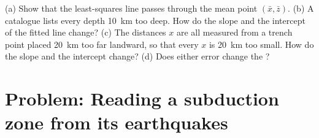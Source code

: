 \begin{exercise}[$\star\star\star$]\label{exo:b1:active-margins:12}
(a) Show that the least-squares line passes through the mean point
$(\bar x, \bar z)$. (b) A catalogue lists every depth \qty{10}{km} too deep.
How do the slope and the intercept of the fitted line change? (c) The distances
$x$ are all measured from a trench point placed \qty{20}{km} too far
landward, so that every $x$ is \qty{20}{km} too small. How do the slope and
the intercept change? (d) Does either error change the ?
\end{exercise}

\section{Problem: Reading a subduction zone from its earthquakes}

